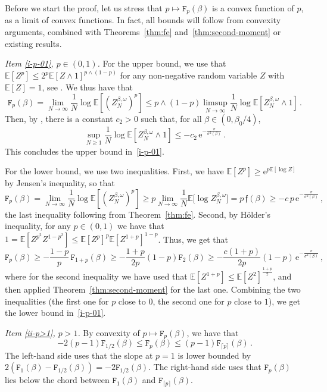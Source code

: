 \documentclass[11pt]{amsart}
\numberwithin{equation}{section}
\newcommand*{\EE}{\mathbb{E}}
\newcommand{\e}{\mathrm{e}}
\newcommand*{\tF}{\mathtt{F}}
\newcommand*{\tf}{\mathfrak{f}}
\theoremstyle{plain}
\theoremstyle{definition}
\theoremstyle{remark}
\begin{document}
Before we start the proof, let us stress that \(p\mapsto \tF_p(\beta)\) is a convex function of \(p\), as a limit of convex functions.
In fact, all bounds will follow from convexity arguments, combined with Theorems~\ref{thm:fe} and~\ref{thm:second-moment} or existing results.

\smallskip
\noindent
\textit{Item \ref{i-p-01}, \(p\in (0,1)\).}
For the upper bound, we use that \(\EE[Z^p] \leq 2^p \EE[ Z\wedge 1]^{p\wedge (1-p)}\) for any non-negative random variable \(Z\) with \(\EE[Z]=1\), see \cite[Lem.~3.3]{BCT25}.
We thus have that 
\[
\tF_p(\beta) = \lim_{N\to\infty} \frac1N \log \EE[(Z_{N}^{\beta,\omega})^p]  \leq p\wedge(1-p) \limsup_{N\to\infty} \frac1N \log \EE[Z_{N}^{\beta,\omega}\wedge 1]\,.
\]
Then, by \cite[Theorem~2.2]{BCT25}, there is a constant \(c_2>0\) such that, for all \(\beta\in (0,\beta_0/4)\), 
\[
\sup_{N\geq 1} \frac1N \log \EE[Z_{N}^{\beta,\omega}\wedge 1] \leq - c_2\, \e^{- \frac{\pi}{\sigma^2(\beta)}} \,.
\]
This concludes the upper bound in~\ref{i-p-01}.

For the lower bound, we use two inequalities. 
First, we have \(\EE[Z^p] \geq \e^{p \EE[\log Z]}\) by Jensen's inequality, so that 
\[
\tF_p(\beta) = \lim_{N\to\infty} \frac1N \log \EE[(Z_{N}^{\beta,\omega})^p]  \geq p \lim_{N\to\infty} \frac1N \EE\big[\log Z_{N}^{\beta,\omega}\big] = p\, \tf(\beta)  \geq - c\, p\, \e^{- \frac{\pi}{\sigma^2(\beta)}}\,,
\]
the last inequality following from Theorem~\ref{thm:fe}.
Second, by Hölder's inequality, for any \(p\in (0,1)\) we have that \(1= \EE[Z^{p^2} Z^{1-p^2}] \leq \EE[Z^p]^{p} \EE[Z^{1+p}]^{1-p}\).
Thus, we get that 
\[
\tF_p(\beta) \geq  - \frac{1-p}{p}\, \tF_{1+p}(\beta) \geq - \frac{1+p}{2p} (1-p) \tF_{2}(\beta) \geq  - \frac{c (1+p)}{2p} (1-p)  \, \e^{- \frac{\pi}{\sigma^2(\beta)}}\,,
\]
where for the second inequality we have used that \(\EE[Z^{1+p}] \leq \EE[Z^2]^{\frac{1+p}{2}}\), and then applied Theorem~\ref{thm:second-moment} for the last one.
Combining the two inequalities (the first one for \(p\) close to \(0\), the second one for \(p\) close to \(1\)), we get the lower bound in~\ref{i-p-01}.

\smallskip
\noindent
\textit{Item \ref{ii-p>1}, \(p>1\).}
By convexity of \(p\mapsto \tF_p(\beta)\), we have that 
\[
 -2(p-1) \tF_{1/2}(\beta) \leq \tF_p(\beta) \leq (p-1) \tF_{\lceil p\rceil}(\beta) \,.
\]
The left-hand side uses that the slope at \(p=1\) is lower bounded by \(2(\tF_1(\beta) -\tF_{1/2}(\beta)) = -2 \tF_{1/2}(\beta)\). 
       The right-hand side uses that \(\tF_p(\beta)\) lies below the chord between \(\tF_1(\beta)\) and \(\tF_{\lceil p \rceil}(\beta)\).
\end{document}

